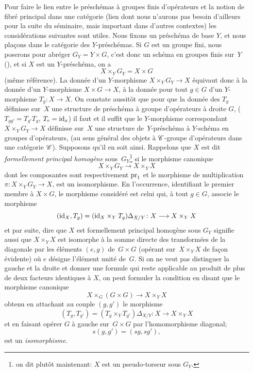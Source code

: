 Pour faire le lien entre le pr\'esch\'emas \`a groupes finis
d'op\'erateurs et la notion de fibr\'e principal dans une
cat\'egorie (lien dont nous n'aurons pas besoin d'ailleurs pour la
suite du s\'eminaire, mais important dans d'autres contextes) les
consid\'erations suivantes sont utiles. Nous fixons un
pr\'esch\'ema de base $Y$, et nous pla\c cons dans le
cat\'egorie des $Y$-pr\'esch\'emas. Si $G$ est un groupe
fini, nous poserons pour abr\'eger $G_Y=Y \times G$, c'est donc un
sch\'ema en groupes finis sur~$Y$ (\cf {}), et si $X$ est
un $Y$-pr\'esch\'ema, on a
$$
X \times_Y G_Y = X \times G
$$
(m\^eme r\'ef\'erence). La donn\'ee d'un $Y$-morphisme $X
\times_Y G_Y \to X$ \'equivaut donc \`a la donn\'ee d'un
$Y$-morphisme $X \times G \to X$, \ie \`a la donn\'ee pour tout
$g \in G$ d'un $Y$-morphisme $T_g \colon X \to X$. On constate
aussit\^ot que pour que la donn\'ee des $T_g$ d\'efinisse sur~$X$ une structure de pr\'esch\'ema \`a groupe d'op\'erateurs
\`a droite $G$, (\ie $T_{gg'}=T_{g'}T_g$, $T_e=\mathrm{id}_x$) il faut et il
suffit que le $Y$-morphisme correspondant $X \times_Y G_Y \to X$
d\'efinisse sur~$X$ une structure de~$Y$-pr\'esch\'ema \`a
$Y$-sch\'ema en groupes d'op\'erateurs, (au sens g\'en\'eral
des objets \`a $\cal{C}$-groupe d'op\'erateurs dans une
cat\'egorie $\cal{C}$). Supposons qu'il en soit ainsi. Rappelons que
$X$ est dit \emph{formellement principal homogène}
sous~$G_Y$\footnote{on dit plut\^ot maintenant: $X$ est un
pseudo-torseur sous $G_Y$.} si le morphisme canonique
$$
X \times_Y G_Y \to X \times_Y X
$$
dont les composantes sont respectivement $\mathrm{pr}_1$ et le morphisme de
multiplication $\pi \colon X \times_Y G_Y \to X$, est un
isomorphisme. En l'occurrence, identifiant le premier membre \`a $X
\times G$, le morphisme consid\'er\'e est celui qui, \`a tout $g
\in G$, associe le morphisme
$$
(\id_X,T_g)=(\id_X \times_Y T_g)\Delta_{X/Y} \colon X \to X \times_Y X
$$
et par suite, dire que $X$ est formellement principal homog\`ene
sous $G_Y$ signifie aussi que $X \times_Y X$ est isomorphe \`a la
somme directe des transform\'ees de la diagonale par les
\'el\'ements $(e,g)$ de~$G \times G$ (op\'erant sur~$X \times_Y
X$ de fa\c con \'evidente) o\`u $e$ d\'esigne l'\'el\'ement
unit\'e de~$G$. Si on ne veut pas distinguer la gauche et la droite
et donner une formule qui reste applicable au produit de plus de deux
facteurs identiques \`a $X$, on peut formuler la condition en disant
que le morphisme canonique
$$
X \times_G (G \times G) \to X \times_Y X
$$
obtenu en attachant au couple $(g,g')$ le morphisme
$$
(T_g,T_{g'})=(T_g \times_Y T_{g'})\Delta_{X/Y} \colon X \to X \times_Y
X
$$
et en faisant op\'erer $G$ \`a gauche sur~$G \times G$ par
l'homomorphisme diagonal;
$$
s(g,g')=(sg,sg'),
$$
est un \emph{isomorphisme}.

